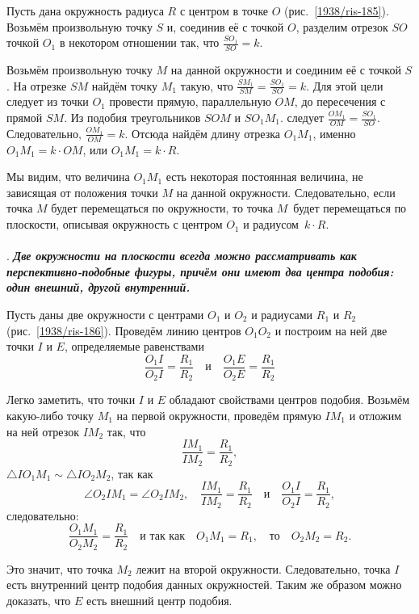 \documentclass[oneside]{book}
\begin{document}
Пусть дана окружность радиуса $R$ с центром в точке $O$ (рис.~\ref{1938/ris-185}).
Возьмём произвольную точку $S$ и, соединив её с точкой $O$, разделим отрезок $SO$ точкой $O_1$ в некотором отношении так, что $\frac{SO_1}{SO}= k$.

Возьмём произвольную точку $M$ на данной окружности и соединим её с точкой $S$.
На отрезке $SM$ найдём точку $M_1$ такую, что $\frac{SM_1}{SM}=\frac{SO_1}{SO}= k$.
Для этой цели следует из точки $O_1$ провести прямую, параллельную $OM$, до пересечения с прямой $SM$.
Из подобия треугольников $SOM$ и $SO_1M_1$.
следует $\frac{OM_1}{OM}=\frac{SO_1}{SO}$.
Следовательно, $\frac{OM_1}{OM}=k$.
Отсюда найдём длину отрезка $O_1M_1$, именно $O_1M_1=k\cdot OM$, или $O_1M_1=k\cdot R$.

Мы видим, что величина $O_1M_1$ есть некоторая постоянная величина, не зависящая от положения точки $M$ на данной окружности.
Следовательно, если точка $M$ будет перемещаться по окружности, то точка $M$\ будет перемещаться по плоскости, описывая окружность с центром $O_1$ и радиусом~$k\cdot R$.

\paragraph{}\label{1938/179}
.
\textbf{\emph{Две окружности на плоскости всегда можно рассматривать как перспективно-подобные фигуры, причём они имеют два центра подобия:
один внешний, другой внутренний.}} %

Пусть даны две окружности с центрами $O_1$ и $O_2$ и радиусами $R_1$ и $R_2$ (рис.~\ref{1938/ris-186}).
Проведём линию центров $O_1O_2$ и построим на ней две точки $I$ и $E$, определяемые равенствами
\[\frac{O_1I}{O_2I}=\frac{R_1}{R_2}\quad\text{и}\quad\frac{O_1E}{O_2E}=\frac{R_1}{R_2}\]

Легко заметить, что точки $I$ и $E$ обладают свойствами центров подобия.
Возьмём какую-либо точку $M_1$ на первой окружности, проведём прямую $IM_1$ и отложим на ней отрезок $IM_2$ так, что 
\[\frac{IM_1}{IM_2}=\frac{R_1}{R_2},\] 
$\triangle IO_1M_1\sim\triangle IO_2M_2$, так как 
\[\angle O_2IM_1=\angle O_2IM_2,\quad \frac{IM_1}{IM_2}=\frac{R_1}{R_2}\quad\text{и}\quad\frac{O_1I}{O_2I}=\frac{R_1}{R_2},\]
следовательно:
\[\frac{O_1M_1}{O_2M_2}=\frac{R_1}{R_2}\quad\text{и так как}\quad O_1M_1=R_1,\quad\text{то}\quad O_2M_2=R_2.\]

Это значит, что точка $M_2$ лежит на второй окружности.
Следовательно, точка $I$ есть внутренний центр подобия данных окружностей.
Таким же образом можно доказать, что $E$ есть внешний центр подобия.
\end{document}
